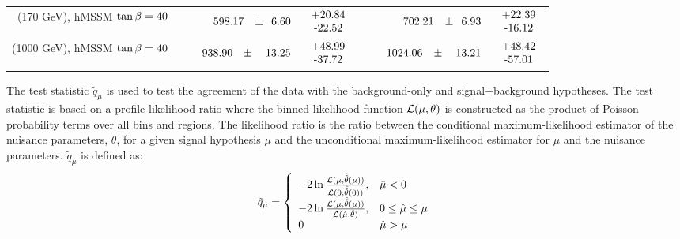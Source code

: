 \begin{table}
\begin{center}
{\begin{tabular}{l|r|r}
			\hline
			\Hpm $\phantom{0}$(170 GeV), hMSSM $\tan\beta=40$ & $\phantom{0}598.17\phantom{.0}\pm\phantom{0}6.60\phantom{.0}\phantom{0}\begin{tabular}{c}+20.84 \\-22.52\end{tabular}$ & $\phantom{0}702.21\phantom{.0}\pm\phantom{0}6.93\phantom{.0}\phantom{0}\begin{tabular}{c}+22.39 \\-16.12\end{tabular}$ \\
			\Hpm (1000 GeV), hMSSM $\tan\beta=40$ &   $\phantom{0000}938.90\phantom{0.}\pm\phantom{00}13.25\phantom{0.}\phantom{0}\begin{tabular}{c}+48.99 \\-37.72\end{tabular}$ & $\phantom{0000}1024.06\phantom{0.}\pm\phantom{00}13.21\phantom{0.}\phantom{0}\begin{tabular}{c}+48.42 \\-57.01\end{tabular}$ \\
			\hline
			\end{tabular}}
			\end{center}
		\end{table}

		The test statistic $\tilde{q}_{\mu}$ \cite{test-statistic} is used to test the agreement of the data with the background-only and signal+background hypotheses. The test statistic is based on a profile likelihood ratio where the binned likelihood function $\cal{L}(\mu,\theta)$ is constructed as the product of Poisson probability terms over all bins and regions. The likelihood ratio is the ratio between the conditional maximum-likelihood estimator of the nuisance parameters, $\theta$, for a given signal hypothesis $\mu$ and the unconditional maximum-likelihood estimator for $\mu$ and the nuisance parameters. $\tilde{q}_{\mu}$ is defined as:
		\begin{equation}
		\tilde{q}_{\mu} = \left\{
		\begin{array}{ll}
		-2\ln\frac{{\cal L}(\mu, \hat{\hat{\theta}}(\mu))}{{\cal L}(0, \hat{\hat{\theta}}(0))}, & \hat{\mu} < 0 \\
		-2\ln\frac{{\cal L}(\mu, \hat{\hat{\theta}}(\mu))}{{\cal L}(\hat{\mu}, \hat{\theta})}, & 0 \leq \hat{\mu} \leq \mu \\
		0 & \hat{\mu} > \mu 
		\end{array}
		\right.
		\end{equation}

